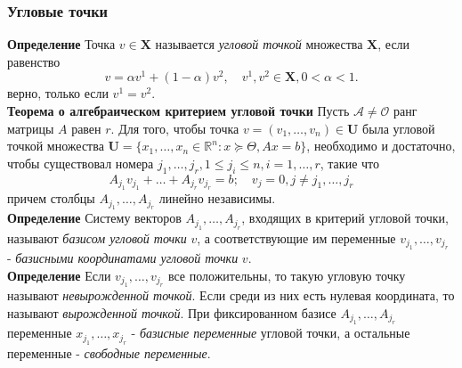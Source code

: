 \documentclass[A4]{article}
\begin{document}
\subsubsection{Угловые точки}
\textbf{Определение} Точка $v\in\mathbf{X}$ называется \emph{угловой точкой} множества $\mathbf{X}$, если равенство
\begin{equation*}
v=\alpha v^1+(1-\alpha)v^2,\quad v^1,v^2\in\mathbf{X},0<\alpha<1.
\end{equation*}
верно, только если $v^1=v^2$. \\
\textbf{Теорема о алгебраическом критерием угловой точки} Пусть $\mathcal{A}\ne\mathcal{O}$ ранг матрицы $A$ равен $r$. Для того, чтобы точка $v=(v_1,\ldots,v_n)\in\mathbf{U}$ была угловой точкой множества $\mathbf{U}=\{x_1,\ldots,x_n \in\mathbb{R}^n:x\succcurlyeq \Theta,Ax=b\}$, необходимо и достаточно, чтобы существовал номера $j_1,\ldots,j_r,1\leqslant j_i\leqslant n,i=1,\ldots,r$, такие что
\begin{equation*}
A_{j_1}v_{j_1}+\ldots+A_{j_r}v_{j_r}=b;\quad v_j=0,j\ne j_1,\ldots,j_r
\end{equation*}
причем столбцы $A_{j_1},\ldots,A_{j_r}$ линейно независимы.\\
\textbf{Определение} Систему векторов $A_{j_1},\ldots,A_{j_r}$, входящих в критерий угловой точки, называют \emph{базисом угловой точки} $v$, а соответствующие им переменные $v_{j_1},\ldots,v_{j_r}$ - \emph{базисными координатами угловой точки} $v$.\\
\textbf{Определение} Если $v_{j_1},\ldots,v_{j_r}$ все положительны, то такую угловую точку называют \emph{невырожденной точкой}. Если среди из них есть нулевая координата, то называют \emph{вырожденной точкой}. При фиксированном базисе $A_{j_1},\ldots,A_{j_r}$ переменные $x_{j_1},\ldots,x_{j_r}$ - \emph{базисные переменные} угловой точки, а остальные переменные - \emph{свободные переменные}.
\end{document}
